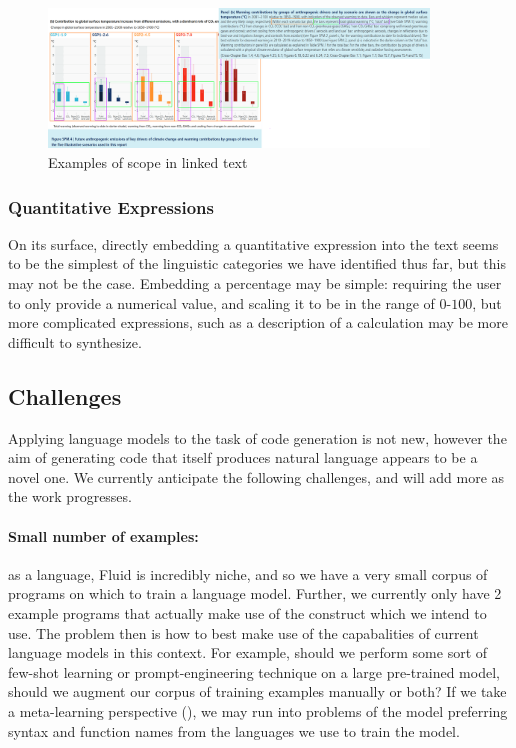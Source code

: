 \begin{figure}
   \includegraphics[width=0.9\textwidth]{fig/ipcc-visual-elements.png}
   \caption{Examples of scope in linked text}
   \label{fig:visual-element-scope}
\end{figure}

\subsubsection{Quantitative Expressions}
On its surface, directly embedding a quantitative expression into the text seems to be the simplest
of the linguistic categories we have identified thus far, but this may not be the case. Embedding
a percentage may be simple: requiring the user to only provide a numerical value, and scaling it
to be in the range of $0$-$100$, but more complicated expressions, such as a description of a calculation
may be more difficult to synthesize. 

\subsection{Challenges}
Applying language models to the task of code generation is not new, however the aim of generating code that
itself produces natural language appears to be a novel one. We currently anticipate the following challenges,
and will add more as the work progresses.

\paragraph{Small number of examples:} as a language, Fluid is incredibly niche, and so we have a very small corpus
of programs on which to train a language model. Further, we currently only have 2 example programs that actually make
use of the  construct which we intend to use. The problem then is how to best make use of the capabalities
of current language models in this context. For example, should we perform some sort of few-shot learning or prompt-engineering
technique on a large pre-trained model, should we augment our corpus of training examples manually or both? If we take a meta-learning
perspective (), we may run into problems of the model preferring syntax and function names from the languages we use to
train the model.

